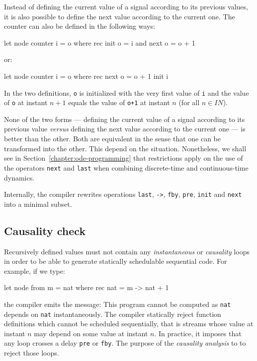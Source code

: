 \documentclass[11pt,titlepage,twoside]{report}
\newcommand{\Nat}{I\!\!N}
\newcommand{\Remark}{\medskip\noindent{\bf Remark: }}
\begin{document}
Instead of defining the current value of a signal according to its previous
values, it is also possible to define the next value according to the current
one. The counter
can also be defined in the following ways:

\begin{runverbatim}
let node counter i = o where
  rec init o = i
  and next o = o + 1
\end{runverbatim}
or:
\begin{runverbatim}
let node counter i = o where
  rec next o = o + 1 init i
\end{runverbatim}
In the two definitions, \texttt{o} is initialized with the very first value of
\verb-i- and the value of \texttt{o} at instant $n+1$ equals the value of
\texttt{o+1} at instant $n$ (for all $n \in \Nat$).

None of the two forms --- defining the current value of a signal
according to its previous value \emph{versus} defining the next value
according to the current one --- is better than the other. Both are
equivalent in the sense that one can be transformed into the
other. This depend on the situation. Nonetheless, we shall see in
Section~\ref{chapter:ode-programming} that restrictions apply on the
use of the operators \texttt{next} and \texttt{last} when combining discrete-time and
continuous-time dynamics.

\Remark Internally, the compiler rewrites
operations \verb-last-, \verb+->+, \verb-fby-, \verb+pre+, \verb+init+
and \verb+next+ into a minimal subset.

\subsection{Causality check}
\label{causality-check}
Recursively defined values must not contain any {\em instantaneous} or
{\em causality} loops in order to be able to generate statically schedulable
sequential code. For example, if we type:
\begin{runverbatim}[fail]
let node from m = nat where
  rec nat = m -> nat + 1
\end{runverbatim}
the compiler emits the message:
\runverbatimerr{}
This program cannot be computed as {\tt nat} depends on {\tt nat}
instantaneously.
The compiler statically reject function definitions which cannot be scheduled
sequentially, that is streams whose value at instant $n$ may depend on
some value at instant $n$. In practice, it imposes that any loop
crosses a delay \verb-pre- or \verb-fby-. The purpose of
the \emph{causality analysis} to to reject those loops.
\end{document}
